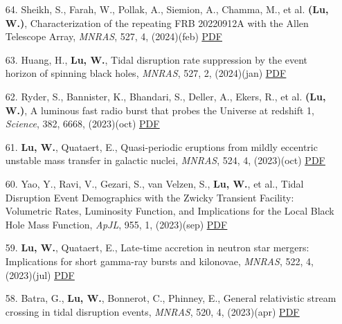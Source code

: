 \begin{itemize}[leftmargin=0.65cm]
\vspace{-0.1cm}
\item[64.]{Sheikh, S., Farah, W., Pollak, A., Siemion, A., Chamma, M., et al. {\bf (Lu, W.)}, {Characterization of the repeating FRB 20220912A with the Allen Telescope Array}, {\it MNRAS}, 527, 4, (2024)(feb) \href{https://ui.adsabs.harvard.edu/abs/2024MNRAS.52710425S}{\underline{PDF}}}

\vspace{-0.1cm}
\item[63.]{Huang, H., {\bf Lu, W.}, {Tidal disruption rate suppression by the event horizon of spinning black holes}, {\it MNRAS}, 527, 2, (2024)(jan) \href{https://ui.adsabs.harvard.edu/abs/2024MNRAS.527.1865H}{\underline{PDF}}}

\vspace{-0.1cm}
\item[62.]{Ryder, S., Bannister, K., Bhandari, S., Deller, A., Ekers, R., et al. {\bf (Lu, W.)}, {A luminous fast radio burst that probes the Universe at redshift 1}, {\it Science}, 382, 6668, (2023)(oct) \href{https://ui.adsabs.harvard.edu/abs/2023Sci...382..294R}{\underline{PDF}}}

\vspace{-0.1cm}
\item[61.]{{\bf Lu, W.}, Quataert, E., {Quasi-periodic eruptions from mildly eccentric unstable mass transfer in galactic nuclei}, {\it MNRAS}, 524, 4, (2023)(oct) \href{https://ui.adsabs.harvard.edu/abs/2023MNRAS.524.6247L}{\underline{PDF}}}

\vspace{-0.1cm}
\item[60.]{Yao, Y., Ravi, V., Gezari, S., van Velzen, S., {\bf Lu, W.}, et al., {Tidal Disruption Event Demographics with the Zwicky Transient Facility: Volumetric Rates, Luminosity Function, and Implications for the Local Black Hole Mass Function}, {\it ApJL}, 955, 1, (2023)(sep) \href{https://ui.adsabs.harvard.edu/abs/2023ApJ...955L...6Y}{\underline{PDF}}}

\vspace{-0.1cm}
\item[59.]{{\bf Lu, W.}, Quataert, E., {Late-time accretion in neutron star mergers: Implications for short gamma-ray bursts and kilonovae}, {\it MNRAS}, 522, 4, (2023)(jul) \href{https://ui.adsabs.harvard.edu/abs/2023MNRAS.522.5848L}{\underline{PDF}}}

\vspace{-0.1cm}
\item[58.]{Batra, G., {\bf Lu, W.}, Bonnerot, C., Phinney, E., {General relativistic stream crossing in tidal disruption events}, {\it MNRAS}, 520, 4, (2023)(apr) \href{https://ui.adsabs.harvard.edu/abs/2023MNRAS.520.5192B}{\underline{PDF}}}


\end{itemize}
